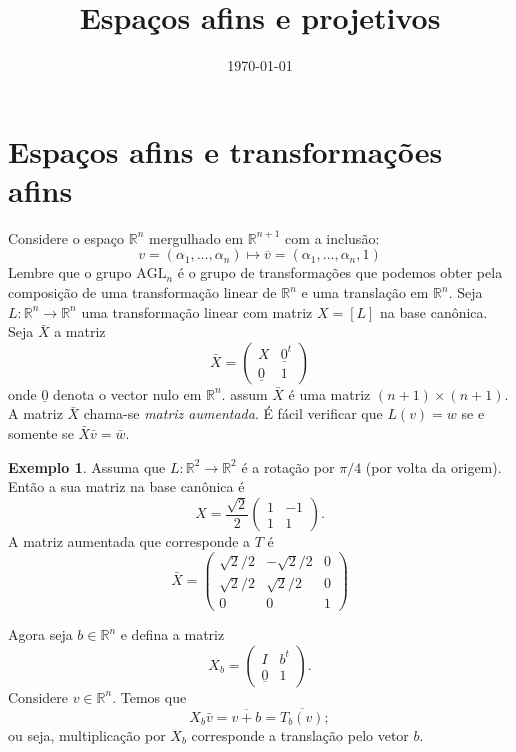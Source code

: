 \documentclass[12pt]{amsart}
\newcommand{\R}{\mathbb R}
\theoremstyle{definition}
\newtheorem{example}[theorem]{Exemplo}
\newcommand{\agl}{\mbox{AGL}}
\begin{document}
\date{\today}
\title{Espaços afins e projetivos}
\maketitle

\section{Espaços afins e transformações afins}

Considere o espaço $\R^n$ mergulhado em $\R^{n+1}$ com a inclusão:
\[
    v=(\alpha_1,\ldots,\alpha_n)\mapsto \overline v=(\alpha_1,\ldots,\alpha_n,1)
\]
Lembre que o grupo $\agl_n$ é o grupo de transformações que podemos obter pela composição de uma 
transformação linear de $\R^n$ e uma translação em $\R^n$. 
Seja $L:\R^n\to \R^n$ uma transformação linear com matriz $X=[L]$ na base canônica. Seja $\bar X$ a 
matriz 
\[ 
    \bar X=\begin{pmatrix} X & \underline 0^t\\ \underline 0 & 1\end{pmatrix} 
\]
onde $\underline 0$ denota o vector nulo em $\R^n$. assum $\bar X$ é uma matriz 
$(n+1)\times(n+1)$. A matriz $\bar X$ chama-se \emph{matriz aumentada}.
É fácil verificar que $L(v)=w$ se e somente se $\bar X\bar v = \bar w$. 
\begin{example}
    Assuma que $L:\R^2\to\R^2$ é a rotação por $\pi/4$ (por volta da origem). 
    Então a sua matriz na base canônica é 
    \[
        X=\frac{\sqrt 2}{2}\begin{pmatrix} 1 & -1\\ 1 & 1\end{pmatrix}.
    \]
    A matriz aumentada que corresponde a $T$ é 
    \[
        \bar X=\begin{pmatrix} \sqrt 2/2 & -\sqrt 2/2 & 0 \\ \sqrt 2/2 & \sqrt 2/2 & 0 \\ 0 & 0 & 1
        \end{pmatrix}
    \]
\end{example}

Agora seja $b\in\R^n$ e defina a matriz 
\[
    X_b=\begin{pmatrix} I & b^t \\ \underline 0 & 1\end{pmatrix}.
\]
Considere $v\in\R^n$. Temos que 
\[
    X_b\bar v=\overline{v+b}=\overline{T_b(v)};
\]
ou seja, multiplicação por $X_b$ corresponde a translação pelo vetor $b$. 
\end{document}
